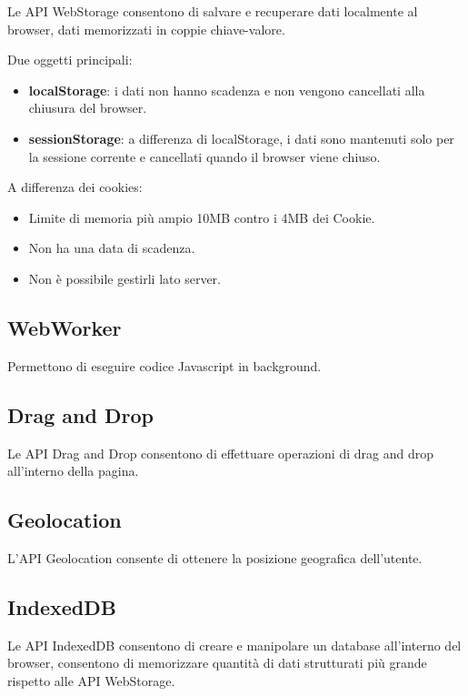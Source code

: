 Le API WebStorage consentono di salvare e recuperare dati localmente al
browser, dati memorizzati in coppie chiave-valore.

Due oggetti principali:

\begin{itemize}
\item
  \textbf{localStorage}: i dati non hanno scadenza e non vengono
  cancellati alla chiusura del browser.
\item
  \textbf{sessionStorage}: a differenza di localStorage, i dati sono
  mantenuti solo per la sessione corrente e cancellati quando il browser
  viene chiuso.
\end{itemize}

A differenza dei cookies:

\begin{itemize}
\item
  Limite di memoria più ampio 10MB contro i 4MB dei Cookie.
\item
  Non ha una data di scadenza.
\item
  Non è possibile gestirli lato server.
\end{itemize}

\subsection{WebWorker}\label{webworker}

Permettono di eseguire codice Javascript in background.

\subsection{Drag and Drop}\label{drag-and-drop}

Le API Drag and Drop consentono di effettuare operazioni di drag and
drop all'interno della pagina.

\subsection{Geolocation}\label{geolocation}

L'API Geolocation consente di ottenere la posizione geografica
dell'utente.

\subsection{IndexedDB}\label{indexeddb}

Le API IndexedDB consentono di creare e manipolare un database
all'interno del browser, consentono di memorizzare quantità di dati
strutturati più grande rispetto alle API WebStorage.

